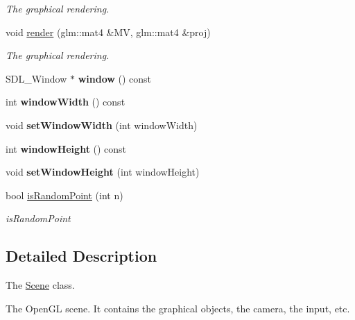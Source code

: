 \begin{DoxyCompactItemize}
\begin{DoxyCompactList}\small\item\em The graphical rendering. \end{DoxyCompactList}\item 
void \hyperlink{classScene_a693d39c8c9c53dfd6307fcd3293506da}{render} (glm\+::mat4 \&M\+V, glm\+::mat4 \&proj)
\begin{DoxyCompactList}\small\item\em The graphical rendering. \end{DoxyCompactList}\item 
\hypertarget{classScene_ae20240e6c189eb8088ae92b4be5625f8}{}S\+D\+L\+\_\+\+Window $\ast$ {\bfseries window} () const \label{classScene_ae20240e6c189eb8088ae92b4be5625f8}

\item 
\hypertarget{classScene_a9ce2dab07ddcb400a08953f9faebfdf5}{}int {\bfseries window\+Width} () const \label{classScene_a9ce2dab07ddcb400a08953f9faebfdf5}

\item 
\hypertarget{classScene_acf77d9dc5f53f98f506e1ffc0636662d}{}void {\bfseries set\+Window\+Width} (int window\+Width)\label{classScene_acf77d9dc5f53f98f506e1ffc0636662d}

\item 
\hypertarget{classScene_ad899521bb92f8a0818d263e255bde87d}{}int {\bfseries window\+Height} () const \label{classScene_ad899521bb92f8a0818d263e255bde87d}

\item 
\hypertarget{classScene_a8e81e065002b9a95c575b94f9129bb35}{}void {\bfseries set\+Window\+Height} (int window\+Height)\label{classScene_a8e81e065002b9a95c575b94f9129bb35}

\item 
bool \hyperlink{classScene_aec8cd9d85f671a8c2c1f45b373fc90b7}{is\+Random\+Point} (int n)
\begin{DoxyCompactList}\small\item\em is\+Random\+Point \end{DoxyCompactList}\end{DoxyCompactItemize}


\subsection{Detailed Description}
The \hyperlink{classScene}{Scene} class. 

The Open\+G\+L scene. It contains the graphical objects, the camera, the input, etc. 

